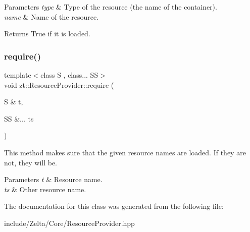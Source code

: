 \begin{DoxyParams}{Parameters}
{\em type} & Type of the resource (the name of the container). \\
\hline
{\em name} & Name of the resource. \\
\hline
\end{DoxyParams}
\begin{DoxyReturn}{Returns}
True if it is loaded. 
\end{DoxyReturn}
\mbox{\label{classzt_1_1_resource_provider_af7a24c529d5255270e032198c985e603}} 
\subsubsection{\texorpdfstring{require()}{require()}}
{\footnotesize\ttfamily template$<$class S , class... SS$>$ \\
void zt\+::\+Resource\+Provider\+::require (\begin{DoxyParamCaption}\item[{S \&}]{t,  }\item[{SS \&...}]{ts }\end{DoxyParamCaption})\hspace{0.3cm}{\ttfamily [inline]}}



This method makes sure that the given resource names are loaded. If they are not, they will be. 


\begin{DoxyParams}{Parameters}
{\em t} & Resource name. \\
\hline
{\em ts} & Other resource name. \\
\hline
\end{DoxyParams}


The documentation for this class was generated from the following file\+:\begin{DoxyCompactItemize}
\item 
include/\+Zelta/\+Core/Resource\+Provider.\+hpp\end{DoxyCompactItemize}
